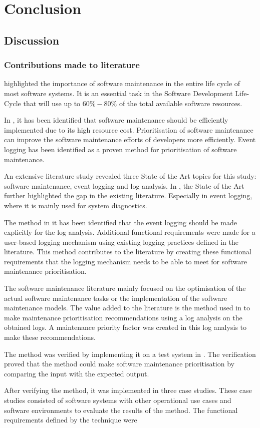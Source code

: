 \chapter{Conclusion}
\label{chap:4}

\section{Discussion}

\subsection{Contributions made to literature}
 highlighted the importance of software maintenance in the entire life cycle of most software systems. It is an essential task in the Software Development Life-Cycle that will use up to $60\%-80\%$ of the total available software resources.\par In , it has been identified that software maintenance should be efficiently implemented due to its high resource cost. Prioritisation of software maintenance can improve the software maintenance efforts of developers more efficiently. Event logging has been identified as a proven method for prioritisation of software maintenance.\par An extensive literature study revealed three State of the Art topics for this study: software maintenance, event logging and log analysis. In , the State of the Art further highlighted the gap in the existing literature. Especially in event logging, where it is mainly used for system diagnostics.\par The method in  it has been identified that the event logging should be made explicitly for the log analysis. Additional functional requirements were made for a user-based logging mechanism using existing logging practices defined in the literature. This method contributes to the literature by creating these functional requirements that the logging mechanism needs to be able to meet for software maintenance prioritisation. \par The software maintenance literature mainly focused on the optimisation of the actual software maintenance tasks or the implementation of the software maintenance models. The value added to the literature is the method used in  to make maintenance prioritisation recommendations using a log analysis on the obtained logs. A maintenance priority factor was created in this log analysis to make these recommendations.\par The method was verified by implementing it on a test system in . The verification proved that the method could make software maintenance prioritisation by comparing the input with the expected output.\par After verifying the method, it was implemented in three case studies. These case studies consisted of software systems with other operational use cases and software environments to evaluate the results of the method. The functional requirements defined by the technique were 